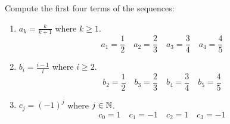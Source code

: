 \guard



\begin{exmp}
\label{exmp:computeTermsOfSequence}
  Compute the first four terms of the sequences:
  \begin{enumerate}
    \item $a_k = \frac{k}{k+1}$ where $k\geq 1$.\\
      \[  a_1=\frac{1}{2}\quad
          a_2=\frac{2}{3}\quad
          a_3=\frac{3}{4}\quad
          a_4=\frac{4}{5} \]
    \item $b_i = \frac{i-1}{i}$ where $i\geq 2$.\\
      \[  b_2=\frac{1}{2}\quad
          b_3=\frac{2}{3}\quad
          b_4=\frac{3}{4}\quad
          b_5=\frac{4}{5} \]
    \item $c_j = (-1)^j$ where $j\in\mathbb{N}$.
      \[  c_0=1\quad
          c_1=-1\quad
          c_2=1\quad
          c_3=-1 \]
  \end{enumerate}
\end{exmp}
